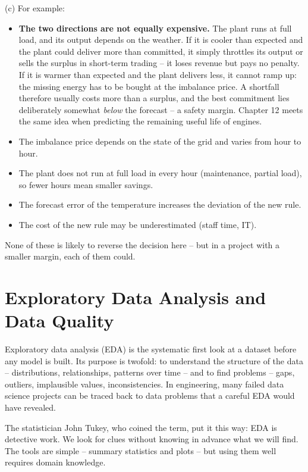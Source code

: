 \documentclass[
  letterpaper,
  DIV=11,
  numbers=noendperiod]{scrreprt}
\providecommand{\tightlist}{%
  \setlength{\itemsep}{0pt}\setlength{\parskip}{0pt}}\usepackage{longtable,booktabs,array}
\begin{document}
\begin{tcolorbox}
(c) For example:

\begin{itemize}
\tightlist
\item
  \textbf{The two directions are not equally expensive.} The plant runs
  at full load, and its output depends on the weather. If it is cooler
  than expected and the plant could deliver more than committed, it
  simply throttles its output or sells the surplus in short-term trading
  -- it loses revenue but pays no penalty. If it is warmer than expected
  and the plant delivers less, it cannot ramp up: the missing energy has
  to be bought at the imbalance price. A shortfall therefore usually
  costs more than a surplus, and the best commitment lies deliberately
  somewhat \emph{below} the forecast -- a safety margin. Chapter 12
  meets the same idea when predicting the remaining useful life of
  engines.
\item
  The imbalance price depends on the state of the grid and varies from
  hour to hour.
\item
  The plant does not run at full load in every hour (maintenance,
  partial load), so fewer hours mean smaller savings.
\item
  The forecast error of the temperature increases the deviation of the
  new rule.
\item
  The cost of the new rule may be underestimated (staff time, IT).
\end{itemize}

None of these is likely to reverse the decision here -- but in a project
with a smaller margin, each of them could.

\end{tcolorbox}

\chapter{Exploratory Data Analysis and Data
Quality}\label{exploratory-data-analysis-and-data-quality}

Exploratory data analysis (EDA) is the systematic first look at a
dataset before any model is built. Its purpose is twofold: to understand
the structure of the data -- distributions, relationships, patterns over
time -- and to find problems -- gaps, outliers, implausible values,
inconsistencies. In engineering, many failed data science projects can
be traced back to data problems that a careful EDA would have revealed.

The statistician John Tukey, who coined the term, put it this way: EDA
is detective work. We look for clues without knowing in advance what we
will find. The tools are simple -- summary statistics and plots -- but
using them well requires domain knowledge.
\end{document}
